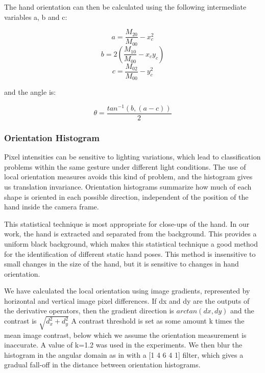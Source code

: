 \bigskip
The hand orientation can then be calculated using the following intermediate variables a, b and c:
\bigskip
\begin{dBox}
\begin{equation}
	a = \frac{M_{20}}{M_{00}} - x_{c}^{2}
\end{equation}
\begin{equation}
	b = 2 (\frac{M_{10}}{M_{00}}-x_{c}y_{c})
\end{equation}
\begin{equation}
    c = \frac{M_{02}}{M_{00}}- y_{c}^{2}
\end{equation}
\end{dBox}
\bigskip
and the angle is:
\begin{dBox}
\begin{equation}
\theta = \frac{tan^{-1}(b,(a-c))}{2}
\end{equation}
\end{dBox}
\bigskip
\subsubsection{Orientation Histogram}
Pixel intensities can be sensitive to lighting variations,
which lead to classification problems within the same gesture under different light conditions. The use of local
orientation measures avoids this kind of problem, and the
histogram gives us translation invariance. Orientation
histograms summarize how much of each shape is oriented in each possible direction, independent of the position of the hand inside the camera frame\cite{feature2}.\bigskip

This statistical technique is most appropriate for close-ups of the hand. In our work, the hand is extracted and separated from the background. This provides a uniform black background, which makes this statistical technique a good method for the identification of different static hand poses. This method is insensitive to small changes in the size of the hand, but it is sensitive to changes in hand orientation.\bigskip

We have calculated the local orientation using image gradients, represented by horizontal and vertical image pixel differences. If dx and dy are the outputs of the derivative operators, then the gradient direction is $arctan(dx,dy)$ and the contrast is  $\sqrt{d_{x}^{2}+d_{y}^{2}}$ A contrast threshold is set as some amount k times the mean image contrast, below which we assume the orientation measurement is inaccurate. A value of k=1.2 was used in the experiments. We then blur the histogram in the angular domain as in\cite{feature3} with a [1 4 6 4 1] filter, which gives a gradual fall-off in the distance between orientation histograms.\bigskip

